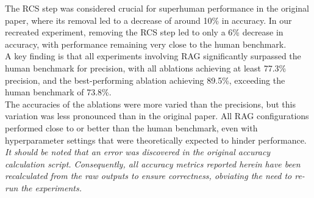 The RCS step was considered crucial for superhuman performance in the original paper, where its removal led to a decrease of around 10\% in accuracy. 
In our recreated experiment, removing the RCS step led to only a 6\% decrease in accuracy, with performance remaining very close to the human benchmark. \\

A key finding is that all experiments involving RAG significantly surpassed the human benchmark for precision, with all ablations achieving at least 77.3\% precision, and the best-performing ablation achieving 89.5\%, exceeding the human benchmark of 73.8\%. \\

The accuracies of the ablations were more varied than the precisions, but this variation was less pronounced than in the original paper. All RAG configurations performed close to or better than the human benchmark, even with hyperparameter settings that were theoretically expected to hinder performance. \\

\textit{It should be noted that an error was discovered in the original accuracy calculation script. Consequently, all accuracy metrics reported herein have been recalculated from the raw outputs to ensure correctness, obviating the need to re-run the experiments.
}





